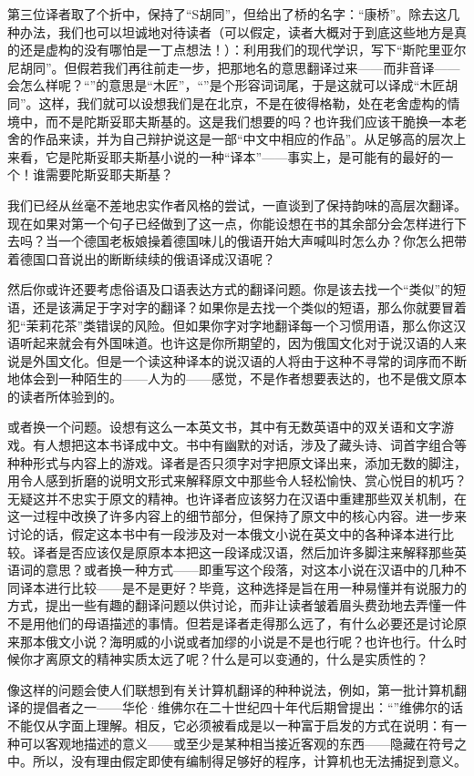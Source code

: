 第三位译者取了个折中，保持了“S胡同”，但给出了桥的名字：“康桥”。除去这几种办法，我们也可以坦诚地对待读者（可以假定，读者大概对于到底这些地方是真的还是虚构的没有哪怕是一丁点想法！）：利用我们的现代学识，写下“斯陀里亚尔尼胡同”。但假若我们再往前走一步，把那地名的意思翻译过来——而非音译——会怎么样呢？“”的意思是“木匠”，“”是个形容词词尾，于是这就可以译成“木匠胡同”。这样，我们就可以设想我们是在北京，不是在彼得格勒，处在老舍虚构的情境中，而不是陀斯妥耶夫斯基的。这是我们想要的吗？也许我们应该干脆换一本老舍的作品来读，并为自己辩护说这是一部“中文中相应的作品”。从足够高的层次上来看，它是陀斯妥耶夫斯基小说的一种“译本”——事实上，是可能有的最好的一个！谁需要陀斯妥耶夫斯基？

我们已经从丝毫不差地忠实作者风格的尝试，一直谈到了保持韵味的高层次翻译。现在如果对第一个句子已经做到了这一点，你能设想在书的其余部分会怎样进行下去吗？当一个德国老板娘操着德国味儿的俄语开始大声喊叫时怎么办？你怎么把带着德国口音说出的断断续续的俄语译成汉语呢？

然后你或许还要考虑俗语及口语表达方式的翻译问题。你是该去找一个“类似”的短语，还是该满足于字对字的翻译？如果你是去找一个类似的短语，那么你就要冒着犯“茉莉花茶”类错误的风险。但如果你字对字地翻译每一个习惯用语，那么你这汉语听起来就会有外国味道。也许这是你所期望的，因为俄国文化对于说汉语的人来说是外国文化。但是一个读这种译本的说汉语的人将由于这种不寻常的词序而不断地体会到一种陌生的——人为的——感觉，不是作者想要表达的，也不是俄文原本的读者所体验到的。

或者换一个问题。设想有这么一本英文书，其中有无数英语中的双关语和文字游戏。有人想把这本书译成中文。书中有幽默的对话，涉及了藏头诗、词首字组合等种种形式与内容上的游戏。译者是否只须字对字把原文译出来，添加无数的脚注，用令人感到折磨的说明文形式来解释原文中那些令人轻松愉快、赏心悦目的机巧？无疑这并不忠实于原文的精神。也许译者应该努力在汉语中重建那些双关机制，在这一过程中改换了许多内容上的细节部分，但保持了原文中的核心内容。进一步来讨论的话，假定这本书中有一段涉及对一本俄文小说在英文中的各种译本进行比较。译者是否应该仅是原原本本把这一段译成汉语，然后加许多脚注来解释那些英语词的意思？或者换一种方式——即重写这个段落，对这本小说在汉语中的几种不同译本进行比较——是不是更好？毕竟，这种选择是旨在用一种易懂并有说服力的方式，提出一些有趣的翻译问题以供讨论，而非让读者皱着眉头费劲地去弄懂一件不是用他们的母语描述的事情。但若是译者走得那么远了，有什么必要还是讨论原来那本俄文小说？海明威的小说或者加缪的小说是不是也行呢？也许也行。什么时候你才离原文的精神实质太远了呢？什么是可以变通的，什么是实质性的？

像这样的问题会使人们联想到有关计算机翻译的种种说法，例如，第一批计算机翻译的提倡者之一——华伦·维佛尔在二十世纪四十年代后期曾提出：“”维佛尔的话不能仅从字面上理解。相反，它必须被看成是以一种富于启发的方式在说明：有一种可以客观地描述的意义——或至少是某种相当接近客观的东西——隐藏在符号之中。所以，没有理由假定即使有编制得足够好的程序，计算机也无法捕捉到意义。

